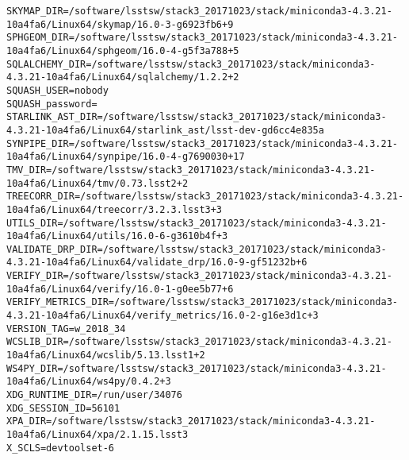 \begin{verbatim}
SKYMAP_DIR=/software/lsstsw/stack3_20171023/stack/miniconda3-4.3.21-10a4fa6/Linux64/skymap/16.0-3-g6923fb6+9
SPHGEOM_DIR=/software/lsstsw/stack3_20171023/stack/miniconda3-4.3.21-10a4fa6/Linux64/sphgeom/16.0-4-g5f3a788+5
SQLALCHEMY_DIR=/software/lsstsw/stack3_20171023/stack/miniconda3-4.3.21-10a4fa6/Linux64/sqlalchemy/1.2.2+2
SQUASH_USER=nobody
SQUASH_password=
STARLINK_AST_DIR=/software/lsstsw/stack3_20171023/stack/miniconda3-4.3.21-10a4fa6/Linux64/starlink_ast/lsst-dev-gd6cc4e835a
SYNPIPE_DIR=/software/lsstsw/stack3_20171023/stack/miniconda3-4.3.21-10a4fa6/Linux64/synpipe/16.0-4-g7690030+17
TMV_DIR=/software/lsstsw/stack3_20171023/stack/miniconda3-4.3.21-10a4fa6/Linux64/tmv/0.73.lsst2+2
TREECORR_DIR=/software/lsstsw/stack3_20171023/stack/miniconda3-4.3.21-10a4fa6/Linux64/treecorr/3.2.3.lsst3+3
UTILS_DIR=/software/lsstsw/stack3_20171023/stack/miniconda3-4.3.21-10a4fa6/Linux64/utils/16.0-6-g3610b4f+3
VALIDATE_DRP_DIR=/software/lsstsw/stack3_20171023/stack/miniconda3-4.3.21-10a4fa6/Linux64/validate_drp/16.0-9-gf51232b+6
VERIFY_DIR=/software/lsstsw/stack3_20171023/stack/miniconda3-4.3.21-10a4fa6/Linux64/verify/16.0-1-g0ee5b77+6
VERIFY_METRICS_DIR=/software/lsstsw/stack3_20171023/stack/miniconda3-4.3.21-10a4fa6/Linux64/verify_metrics/16.0-2-g16e3d1c+3
VERSION_TAG=w_2018_34
WCSLIB_DIR=/software/lsstsw/stack3_20171023/stack/miniconda3-4.3.21-10a4fa6/Linux64/wcslib/5.13.lsst1+2
WS4PY_DIR=/software/lsstsw/stack3_20171023/stack/miniconda3-4.3.21-10a4fa6/Linux64/ws4py/0.4.2+3
XDG_RUNTIME_DIR=/run/user/34076
XDG_SESSION_ID=56101
XPA_DIR=/software/lsstsw/stack3_20171023/stack/miniconda3-4.3.21-10a4fa6/Linux64/xpa/2.1.15.lsst3
X_SCLS=devtoolset-6
\end{verbatim}
